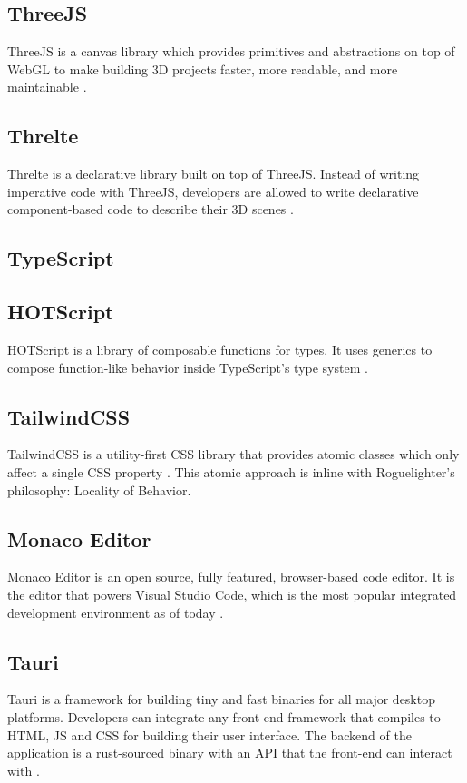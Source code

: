 \documentclass{article}
\begin{document}
\subsection{ThreeJS}
ThreeJS is a canvas library which provides primitives and abstractions on top of WebGL to make building 3D projects faster, more readable, and more maintainable \cite{threejs}.

\subsection{Threlte}
Threlte is a declarative library built on top of ThreeJS. Instead of writing imperative code with ThreeJS, developers are allowed to write declarative component-based code to describe their 3D scenes \cite{threlte}.

\subsection{TypeScript}

\subsection{HOTScript}
HOTScript is a library of composable functions for types. It uses generics to compose function-like behavior inside TypeScript’s type system \cite{hotscript}.

\subsection{TailwindCSS}
TailwindCSS is a utility-first CSS library that provides atomic classes which only affect a single CSS property . This atomic approach is inline with Roguelighter's philosophy: Locality of Behavior\cite{tailwindcss}.

\subsection{Monaco Editor}
Monaco Editor is an open source, fully featured, browser-based code editor. It is the editor that powers Visual Studio Code, which is the most popular integrated development environment as of today \cite{monaco-editor}\cite{developer-survey}.

\subsection{Tauri}
Tauri is a framework for building tiny and fast binaries for all major desktop platforms. Developers can integrate any front-end framework that compiles to HTML, JS and CSS for building their user interface. The backend of the application is a rust-sourced binary with an API that the front-end can interact with \cite{tauri}.
\end{document}
